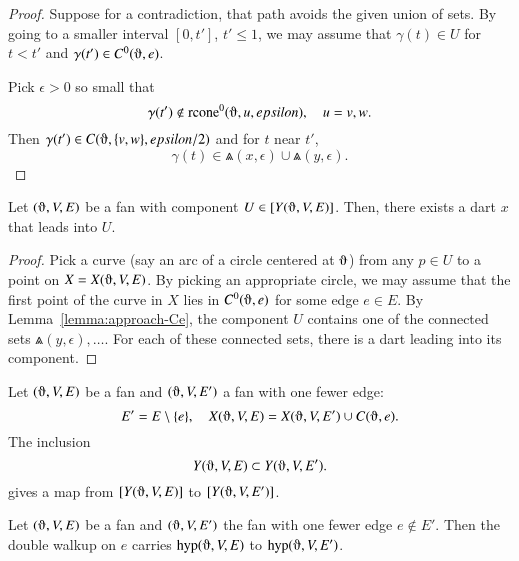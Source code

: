 \begin{proof}
Suppose for a contradiction, that path avoids the given union
of sets.  By going to a smaller interval $[0,t']$, $t'\le 1$,
we may assume that $\gamma(t)\in U$ for $t < t'$ and $\gamma(t')\in
C^0(\orgn,e)$.  

Pick $\epsilon>0$ so small that 
  $$\gamma(t')\not\in \op{rcone}^0(\orgn,u,\epsilon),\quad u=v,w.
  $$
%
Then $\gamma(t')\in C(\orgn,\{v,w\},\epsilon/2)$ and for $t$ near $t'$,
$$\gamma(t)\in \Wedge(x,\epsilon)\cup \Wedge(y,\epsilon).$$
\end{proof}

\begin{lemma}
Let $(\orgn,V,E)$ be a fan with component $U\in\comp{Y(\orgn,V,E)}$.
Then, there exists a
dart $x$ that leads into $U$.
\end{lemma}

\begin{proof}  Pick a curve (say an arc of a
circle centered at $\orgn$) from any $p\in U$ to a point on $X=X(\orgn,V,E)$.
By picking an appropriate circle, 
we may assume that the first point of the curve in $X$ lies
in $C^0(\orgn,e)$ for some edge $e\in E$.  
By Lemma~\ref{lemma:approach-Ce},
the component $U$ contains one of the connected
sets $\Wedge(y,\epsilon),\ldots$.
For each of these connected sets, there is a dart leading
into its component.
\end{proof}

\begin{lemma}
Let $(\orgn,V,E)$ be a fan and $(\orgn,V,E')$
a fan with one fewer edge:
  $$
  E' = E\setminus\{e\}, \quad X(\orgn,V,E) = X(\orgn,V,E')\cup C(\orgn,e).
  $$
The inclusion  $$Y(\orgn,V,E) \subset Y(\orgn,V,E').
   $$
gives a map
from $\comp{Y(\orgn,V,E)}$ to
$\comp{Y(\orgn,V,E')}$.
\end{lemma}

\begin{lemma}
Let $(\orgn,V,E)$ be a fan and $(\orgn,V,E')$
the fan with one fewer edge $e\not\in E'$.
Then the double walkup on $e$
carries $\op{hyp}(\orgn,V,E)$ to
$\op{hyp}(\orgn,V,E')$.
\end{lemma}

